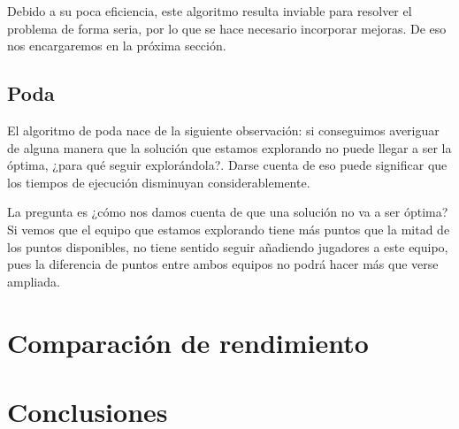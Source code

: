 \documentclass[a4paper, 11pt]{article}
\begin{document}
Debido a su poca eficiencia, este algoritmo resulta inviable para resolver el problema de forma seria, por lo que se hace necesario incorporar mejoras. De eso nos encargaremos en la próxima sección.

\subsection{Poda}
El algoritmo de poda nace de la siguiente observación: si conseguimos averiguar de alguna manera que la solución que estamos explorando no puede llegar a ser la óptima, ¿para qué seguir explorándola?. Darse cuenta de eso puede significar que los tiempos de ejecución disminuyan considerablemente. 

La pregunta es ¿cómo nos damos cuenta de que una solución no va a ser óptima? Si vemos que el equipo que estamos explorando tiene más puntos que la mitad de los puntos disponibles, no tiene sentido seguir añadiendo jugadores a este equipo, pues la diferencia de puntos entre ambos equipos no podrá hacer más que verse ampliada. 

\section{Comparación de rendimiento}

\section{Conclusiones}
\end{document}
